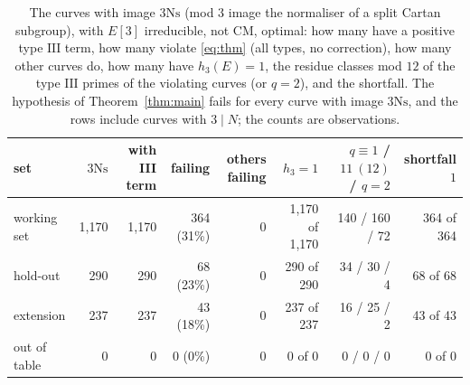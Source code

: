 \documentclass[11pt]{amsart}
\theoremstyle{definition}
\newcommand{\Ns}{3\mathrm{Ns}}
\begin{document}
\begin{table}[ht]\centering\scriptsize\setlength{\tabcolsep}{3pt}
{\scriptsize\setlength{\tabcolsep}{3pt}
\begin{tabular}{lrrrrrrr}
\toprule
set & $\Ns$ & with III term & failing & others failing & $h_3=1$ & $q\equiv1$ / $11\ (12)$ / $q=2$ & shortfall $1$\\
\midrule
working set & 1,170 & 1,170 & 364 (31\%) & 0 & 1,170 of 1,170 & 140 / 160 / 72 & 364 of 364\\
hold-out & 290 & 290 & 68 (23\%) & 0 & 290 of 290 & 34 / 30 / 4 & 68 of 68\\
extension & 237 & 237 & 43 (18\%) & 0 & 237 of 237 & 16 / 25 / 2 & 43 of 43\\
out of table & 0 & 0 & 0 (0\%) & 0 & 0 of 0 & 0 / 0 / 0 & 0 of 0\\
\bottomrule
\end{tabular}
}
\caption{The curves with image $\Ns$ (mod $3$ image the normaliser of a split Cartan subgroup), with $E[3]$ irreducible, not CM, optimal: how many have a positive type $\mathrm{III}$ term, how many violate \eqref{eq:thm} (all types, no correction), how many other curves do, how many have $h_3(E)=1$, the residue classes mod $12$ of the type $\mathrm{III}$ primes of the violating curves (or $q=2$), and the shortfall. The hypothesis of Theorem~\ref{thm:main} fails for every curve with image $\Ns$, and the rows include curves with $3\mid N$; the counts are observations.}\label{tab:ns}
\end{table}
\end{document}
